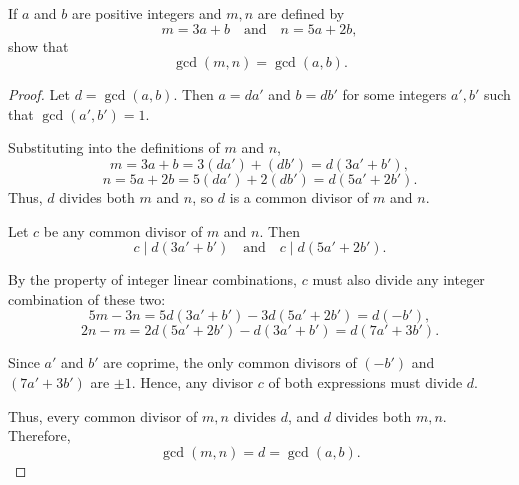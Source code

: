 \documentclass{tufte-handout}
\begin{document}
\begin{question}

If \(a\) and \(b\) are positive integers and \(m, n\) are defined by
\[
m = 3a + b \quad \text{and} \quad n = 5a + 2b,
\]
show that
\[
\gcd(m, n) = \gcd(a, b).
\]

\begin{proof}

Let \(d = \gcd(a, b)\).  
Then \(a = da'\) and \(b = db'\) for some integers \(a', b'\) such that \(\gcd(a', b') = 1\).

Substituting into the definitions of \(m\) and \(n\),
\[
m = 3a + b = 3(da') + (db') = d(3a' + b'),
\]
\[
n = 5a + 2b = 5(da') + 2(db') = d(5a' + 2b').
\]
Thus, \(d\) divides both \(m\) and \(n\), so \(d\) is a common divisor of \(m\) and \(n\).

\medskip

Let \(c\) be any common divisor of \(m\) and \(n\).  
Then
\[
c \mid d(3a' + b') \quad \text{and} \quad c \mid d(5a' + 2b').
\]

By the property of integer linear combinations, \(c\) must also divide any integer combination of these two:
\[
5m - 3n = 5d(3a' + b') - 3d(5a' + 2b') = d(-b'),
\]
\[
2n - m = 2d(5a' + 2b') - d(3a' + b') = d(7a' + 3b').
\]

Since \(a'\) and \(b'\) are coprime, the only common divisors of \((-b')\) and \((7a' + 3b')\) are \(\pm 1\).  
Hence, any divisor \(c\) of both expressions must divide \(d\).

\medskip

Thus, every common divisor of \(m, n\) divides \(d\), and \(d\) divides both \(m, n\).  
Therefore,
\[
\gcd(m, n) = d = \gcd(a, b).
\]

\end{proof}

\end{question}

\end{document}
